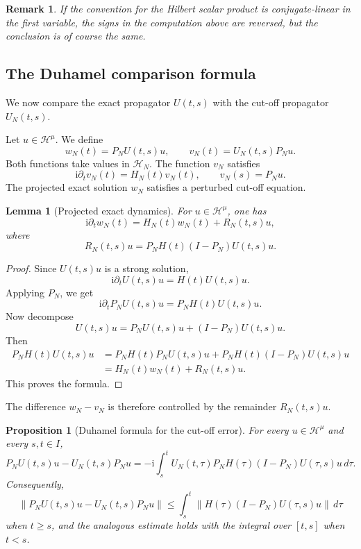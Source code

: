 \documentclass[10pt,a4paper]{amsart}
\newtheorem{proposition}[theorem]{Proposition}
\newtheorem{lemma}[theorem]{Lemma}
\newtheorem{remark}[theorem]{Remark}
\newcommand{\Hilb}{\mathcal H}
\newcommand{\ii}{\mathrm i}
\begin{document}
\begin{remark}
If the convention for the Hilbert scalar product is conjugate-linear in
the first variable, the signs in the computation above are reversed,
but the conclusion is of course the same.
\end{remark}

\subsection{The Duhamel comparison formula}

We now compare the exact propagator \(U(t,s)\) with the cut-off
propagator \(U_N(t,s)\).

Let \(u\in\Hilb^\mu\).  We define
\[
        w_N(t)=P_NU(t,s)u,
        \qquad
        v_N(t)=U_N(t,s)P_Nu.
\]
Both functions take values in \(\Hilb_N\).  The function \(v_N\)
satisfies
\[
        \ii\partial_t v_N(t)=H_N(t)v_N(t),
        \qquad
        v_N(s)=P_Nu.
\]
The projected exact solution \(w_N\) satisfies a perturbed cut-off
equation.

\begin{lemma}[Projected exact dynamics]
\label{lem:projected-exact}
For \(u\in\Hilb^\mu\), one has
\[
        \ii\partial_t w_N(t)
        =
        H_N(t)w_N(t)
        +
        R_N(t,s)u,
\]
where
\[
        R_N(t,s)u
        =
        P_NH(t)(I-P_N)U(t,s)u.
\]
\end{lemma}

\begin{proof}
Since \(U(t,s)u\) is a strong solution,
\[
        \ii\partial_t U(t,s)u=H(t)U(t,s)u.
\]
Applying \(P_N\), we get
\[
        \ii\partial_t P_NU(t,s)u
        =
        P_NH(t)U(t,s)u.
\]
Now decompose
\[
        U(t,s)u=P_NU(t,s)u+(I-P_N)U(t,s)u.
\]
Then
\[
\begin{aligned}
        P_NH(t)U(t,s)u
        &=
        P_NH(t)P_NU(t,s)u
        +
        P_NH(t)(I-P_N)U(t,s)u     \\
        &=
        H_N(t)w_N(t)
        +
        R_N(t,s)u.
\end{aligned}
\]
This proves the formula.
\end{proof}

The difference \(w_N-v_N\) is therefore controlled by the remainder
\(R_N(t,s)u\).

\begin{proposition}[Duhamel formula for the cut-off error]
\label{prop:duhamel-cutoff}
For every \(u\in\Hilb^\mu\) and every \(s,t\in I\),
\[
        P_NU(t,s)u-U_N(t,s)P_Nu
        =
        -\ii
        \int_s^t
        U_N(t,\tau)
        P_NH(\tau)(I-P_N)U(\tau,s)u
        \,d\tau .
\]
Consequently,
\[
        \|P_NU(t,s)u-U_N(t,s)P_Nu\|
        \leq
        \int_s^t
        \|H(\tau)(I-P_N)U(\tau,s)u\|
        \,d\tau
\]
when \(t\geq s\), and the analogous estimate holds with the integral
over \([t,s]\) when \(t<s\).
\end{proposition}
\end{document}
